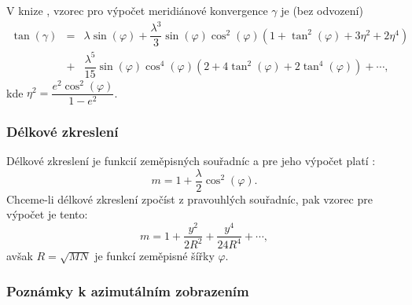 \documentclass[11pt,a4paper]{article}
\begin{document}
V knize \cite{Buchar2002}, vzorec pro výpočet meridiánové konvergence $\gamma$ je (bez odvození)
\begin{eqnarray}
\tan{\left(\gamma\right)} &=& \lambda\sin{\left(\varphi\right)} + \dfrac{\lambda^{3}}{3}\sin{\left(\varphi\right)} \cos^{2}{\left(\varphi\right)}\left(1+\tan^{2}{\left(\varphi\right)} + 3\eta^{2} + 2\eta^{4} \right)  \\ \nonumber
                         &+&\dfrac{\lambda^{5}}{15}\sin{\left(\varphi\right)} \cos^{4}{\left(\varphi\right)}\left(2+4\tan^{2}{\left(\varphi\right)} +2\tan^{4}{\left(\varphi\right)} \right) + \cdots, \nonumber
\end{eqnarray}
kde $\eta^{2} = \dfrac{e^{2}\cos^{2}{\left(\varphi\right)}}{1-e^{2}}$.

\subsubsection*{Délkové zkreslení}
Délkové zkreslení je funkcií zeměpisných souřadníc a pre jeho výpočet platí \cite{Buchar2002}:
\begin{equation}
m = 1+\dfrac{\lambda}{2}\cos^{2}{\left(\varphi\right)}.
\end{equation}
Chceme-li délkové zkreslení zpočíst z pravouhlých souřadníc, pak vzorec pre výpočet je tento:
\begin{equation}
m = 1+\dfrac{y^{2}}{2R^{2}} + \dfrac{y^{4}}{24R^{4}} + \cdots,
\end{equation}
avšak $R = \sqrt{MN}$ je funkcí zeměpisné šířky $\varphi$.



\subsubsection{Poznámky k azimutálním zobrazením}
\end{document}
